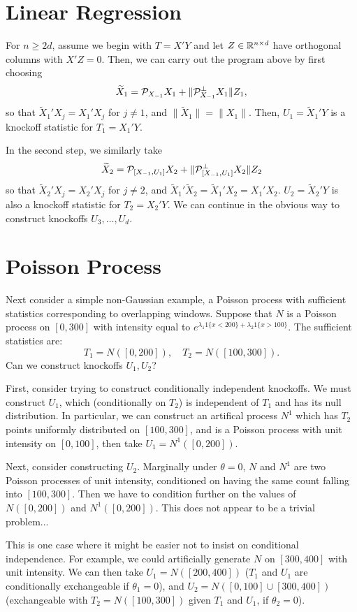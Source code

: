 \documentclass{article}
\begin{document}
\section{Linear Regression}

For $n\geq 2d$, assume we begin with $T = X'Y$ and let $Z\in\mathbb{R}^{n\times d}$ have orthogonal columns with $X'Z=0$. Then, we can carry out the program above by first choosing 
\begin{equation}
  \widetilde X_1 = \mathcal{P}_{X_{-1}}X_1 + \|\mathcal{P}_{X_{-1}}^\perp X_1\|Z_1,
\end{equation}
so that $\widetilde X_1'X_j = X_1'X_j$ for $j\neq 1$, and $\|\widetilde X_1\| = \|X_1\|$. Then, $U_1 = \widetilde X_1'Y$ is a knockoff statistic for $T_1=X_1'Y$.

In the second step, we similarly take 
\begin{equation}
  \widetilde X_2 = \mathcal{P}_{[X_{-1},U_1]}X_2 + \|\mathcal{P}_{[X_{-1},U_1]}^\perp X_2\|Z_2
\end{equation}
so that $\widetilde X_2'X_j = X_2'X_j$ for $j\neq 2$, and $\widetilde X_1'\widetilde X_2 = \widetilde X_1'X_2 = X_1'X_2$. $U_2 = \widetilde X_2'Y$ is also a knockoff statistic for $T_2=X_2'Y$. We can continue in the obvious way to construct knockoffs $U_3,\ldots,U_d$.

\section{Poisson Process}

Next consider a simple non-Gaussian example, a Poisson process with sufficient statistics corresponding to overlapping windows. Suppose that $N$ is a Poisson process on $[0,300]$ with intensity equal to $e^{\lambda_1 1\{x<200\} + \lambda_2 1\{x>100\}}$. The sufficient statistics are:
\begin{equation}
  T_1=N([0,200]), \quad T_2=N([100,300]).
\end{equation}
Can we construct knockoffs $U_1,U_2$?

First, consider trying to construct conditionally independent knockoffs. We must construct $U_1$, which (conditionally on $T_2$) is independent of $T_1$ and has its null distribution. In particular, we can construct an artifical process $N^1$ which has $T_2$ points uniformly distributed on $[100,300]$, and is a Poisson process with unit intensity on $[0,100]$, then take $U_1=N^1([0,200])$.

Next, consider constructing $U_2$. Marginally under $\theta=0$, $N$ and $N^1$ are two Poisson processes of unit intensity, conditioned on having the same count falling into $[100,300]$. Then we have to condition further on the values of $N([0,200])$ and $N^1([0,200])$. This does not appear to be a trivial problem...

This is one case where it might be easier not to insist on conditional independence. For example, we could artificially generate $N$ on $[300,400]$ with unit intensity. We can then take $U_1=N([200,400])$ ($T_1$ and $U_1$ are conditionally exchangeable if $\theta_1=0$), and $U_2=N([0,100] \cup [300,400])$ (exchangeable with $T_2=N([100,300])$ given $T_1$ and $U_1$, if $\theta_2=0$).



\end{document}
